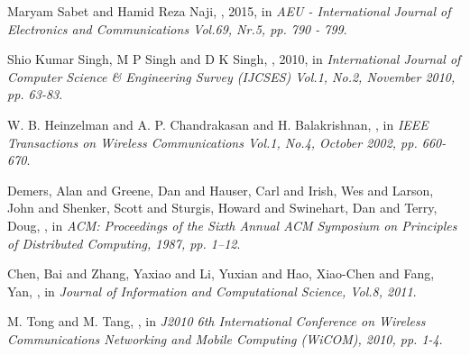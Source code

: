 \documentclass[USenglish]{uit-thesis}
\begin{document}
\begin{thebibliography}{9}
Maryam Sabet and Hamid Reza Naji,
, 2015,
\newblock in {\em AEU - International Journal of Electronics and Communications Vol.69, Nr.5, pp. 790 - 799}.

Shio Kumar Singh, M P Singh and D K Singh,
, 2010,
\newblock in {\em International Journal of Computer Science \& Engineering Survey (IJCSES) Vol.1, No.2, November 2010, pp. 63-83}.

W. B. Heinzelman and A. P. Chandrakasan and H. Balakrishnan,
,
\newblock in {\em IEEE Transactions on Wireless Communications Vol.1, No.4, October 2002, pp. 660-670}.

Demers, Alan and Greene, Dan and Hauser, Carl and Irish, Wes and Larson, John and Shenker, Scott and Sturgis, Howard and Swinehart, Dan and Terry, Doug,
,
\newblock in {\em ACM: Proceedings of the Sixth Annual ACM Symposium on Principles of Distributed Computing, 1987, pp. 1--12}.

Chen, Bai and Zhang, Yaxiao and Li, Yuxian and Hao, Xiao-Chen and Fang, Yan,
,
\newblock in {\em Journal of Information and Computational Science, Vol.8, 2011}.

M. Tong and M. Tang,
,
\newblock in {\em J2010 6th International Conference on Wireless Communications Networking and Mobile Computing (WiCOM), 2010, pp. 1-4}.




\end{thebibliography}
\end{document}
